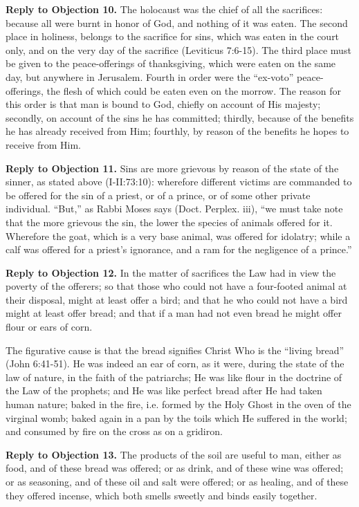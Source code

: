 \textbf{Reply to Objection 10.} The holocaust was the chief of all the sacrifices: because all were burnt in honor of God, and nothing of it was eaten. The second place in holiness, belongs to the sacrifice for sins, which was eaten in the court only, and on the very day of the sacrifice (Leviticus 7:6-15). The third place must be given to the peace-offerings of thanksgiving, which were eaten on the same day, but anywhere in Jerusalem. Fourth in order were the ``ex-voto'' peace-offerings, the flesh of which could be eaten even on the morrow. The reason for this order is that man is bound to God, chiefly on account of His majesty; secondly, on account of the sins he has committed; thirdly, because of the benefits he has already received from Him; fourthly, by reason of the benefits he hopes to receive from Him.

\textbf{Reply to Objection 11.} Sins are more grievous by reason of the state of the sinner, as stated above (I-II:73:10): wherefore different victims are commanded to be offered for the sin of a priest, or of a prince, or of some other private individual. ``But,'' as Rabbi Moses says (Doct. Perplex. iii), ``we must take note that the more grievous the sin, the lower the species of animals offered for it. Wherefore the goat, which is a very base animal, was offered for idolatry; while a calf was offered for a priest's ignorance, and a ram for the negligence of a prince.''

\textbf{Reply to Objection 12.} In the matter of sacrifices the Law had in view the poverty of the offerers; so that those who could not have a four-footed animal at their disposal, might at least offer a bird; and that he who could not have a bird might at least offer bread; and that if a man had not even bread he might offer flour or ears of corn.

The figurative cause is that the bread signifies Christ Who is the ``living bread'' (John 6:41-51). He was indeed an ear of corn, as it were, during the state of the law of nature, in the faith of the patriarchs; He was like flour in the doctrine of the Law of the prophets; and He was like perfect bread after He had taken human nature; baked in the fire, i.e. formed by the Holy Ghost in the oven of the virginal womb; baked again in a pan by the toils which He suffered in the world; and consumed by fire on the cross as on a gridiron.

\textbf{Reply to Objection 13.} The products of the soil are useful to man, either as food, and of these bread was offered; or as drink, and of these wine was offered; or as seasoning, and of these oil and salt were offered; or as healing, and of these they offered incense, which both smells sweetly and binds easily together.

